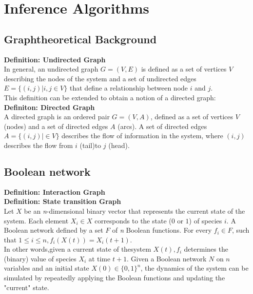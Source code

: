 \newpage
\section{Inference Algorithms}


\subsection{Graphtheoretical Background}
\textbf{Definition: Undirected Graph}\\
In general, an undirected graph $G=(V,E)$ is defined as a set of vertices $V$ describing the nodes of the system and a set of undirected edges $E = \{ (i,j)|i,j\in V\} $ that define a relationship between node $i$ and $j$.\\

This definition can be extended to obtain a notion of a directed graph:\\

\textbf{Definiton: Directed Graph}\\
A directed graph is an ordered pair $G=(V,A)$, defined as a set of vertices $V$ (nodes) and a set of directed edges $A$ (arcs). A set of directed edges $A=\{ (i,j)|\in V\} $ describes the flow of information in the system, where $(i,j)$ describes the flow from $i$ (tail)to $j$ (head). 



\subsection{Boolean network}


\textbf{Definition: Interaction Graph}\\
\textbf{Definition: State transition Graph}\\
Let $X$ be an \textit{n}-dimensional binary vector that represents the current state of the system. Each element $X_i\in X$ corresponds to the state ($0$ or $1$) of species $i$. A Boolean network defined by a set $F$ of \textit{n} Boolean functions. For every $f_i\in F$, such that $1\leq i\leq n,f_i(X(t))=X_i(t+1)$.\\ 

In other words,given a current state of thesystem $X(t),f_i$ determines the (binary) value of species $X_i$ at time $t+1$. Given a Boolean network $N$ on $n$ variables and an initial state $X(0)\in \lbrace 0,1\rbrace ^n$, the dynamics of the system can be simulated by repeatedly applying the Boolean functions and updating the "current" state.


